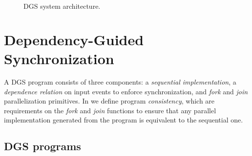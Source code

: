 \begin{figure}
  \centering

  \caption{DGS system architecture.}
\label{dgs:fig:system-architecture-overview}
\end{figure}

\section{Dependency-Guided Synchronization}
\label{dgs:sec:prog-model}

A DGS program consists of three components: a
\emph{sequential implementation}, a \emph{dependence relation} on input
events to enforce synchronization, and \emph{fork} and \emph{join}
parallelization primitives.
In  we define program \emph{consistency}, which are requirements on the \emph{fork} and \emph{join} functions to ensure that any parallel implementation generated from the program is equivalent to the sequential one.

\subsection{DGS programs}
\label{dgs:ssec:prog-model-walkthrough}

